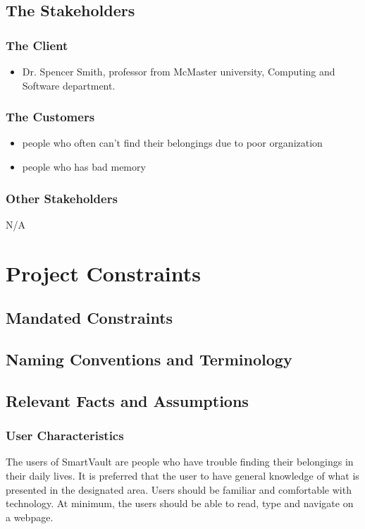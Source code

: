 \documentclass[12pt]{article}
\begin{document}
\subsection{The Stakeholders}

\subsubsection{The Client}
\begin{itemize}
    \item Dr. Spencer Smith, professor from McMaster university, Computing and Software department. 
\end{itemize}

\subsubsection{The Customers}
\begin{itemize}
    \item people who often can't find their belongings due to poor organization
   	\item people who has bad memory  
\end{itemize}
\subsubsection{Other Stakeholders}
N/A
\section{Project Constraints}
\subsection{Mandated Constraints}

\subsection{Naming Conventions and Terminology}

\subsection{Relevant Facts and Assumptions}




\subsubsection{User Characteristics}
The users of SmartVault are people who have trouble finding their belongings in their daily lives. It is preferred that the user to have general knowledge of what is presented in the designated area. Users should be familiar and comfortable with technology. At minimum, the users should be able to read, type and navigate on a webpage. 
\end{document}
